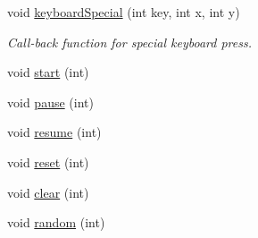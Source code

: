 \begin{DoxyCompactItemize}
void \hyperlink{classSimulation_ac60b25961b18057239efcb610b5c679f}{keyboard\-Special} (int key, int x, int y)
\begin{DoxyCompactList}\small\item\em Call-\/back function for special keyboard press. \end{DoxyCompactList}\item 
void \hyperlink{classSimulation_adaf59b9b5a544f6214d636632a16d6d4}{start} (int)
\item 
void \hyperlink{classSimulation_a72676ce712a367d4124bf88f4165b7b7}{pause} (int)
\item 
void \hyperlink{classSimulation_aecfee72e6cd12d7b2a847a9c9b0634ec}{resume} (int)
\item 
void \hyperlink{classSimulation_aa35f76e4125149c4bd71b2d870eaa70d}{reset} (int)
\item 
void \hyperlink{classSimulation_ae47fcb172ad1e42adeb91c0a9bc8e1cd}{clear} (int)
\item 
void \hyperlink{classSimulation_a71222e784171f690ec3953de65c4a84c}{random} (int)
\end{DoxyCompactItemize}
